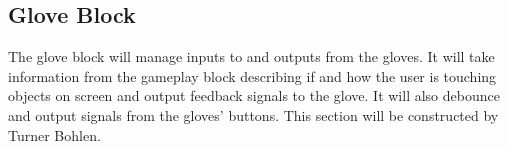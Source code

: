 \subsection{Glove Block}

The glove block will manage inputs to and outputs from the gloves. It will take
information from the gameplay block describing if and how the user is touching
objects on screen and output feedback signals to the glove. It will also
debounce and output signals from the gloves' buttons. This section will be
constructed by Turner Bohlen.
